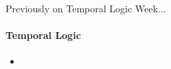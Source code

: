 
\begin{frame}{Previously on Temporal Logic Week...}
  \framesubtitle{Temporal Logic}
  \begin{itemize}

	\item
    
  \end{itemize}

\end{frame}